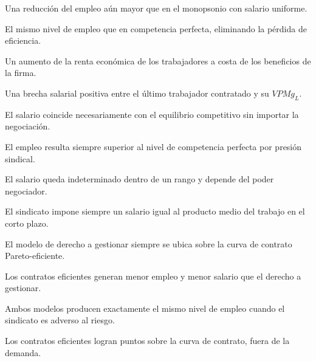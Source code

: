 \begin{opts}
    \item Una reducción del empleo aún mayor que en el monopsonio con salario uniforme.
    \item El mismo nivel de empleo que en competencia perfecta, eliminando la pérdida de eficiencia.
    \item Un aumento de la renta económica de los trabajadores a costa de los beneficios de la firma.
    \item Una brecha salarial positiva entre el último trabajador contratado y su $VPMg_L$.
\end{opts}

\begin{opts}
    \item El salario coincide necesariamente con el equilibrio competitivo sin importar la negociación.
    \item El empleo resulta siempre superior al nivel de competencia perfecta por presión sindical.
    \item El salario queda indeterminado dentro de un rango y depende del poder negociador.
    \item El sindicato impone siempre un salario igual al producto medio del trabajo en el corto plazo.
\end{opts}

\begin{opts}
    \item El modelo de derecho a gestionar siempre se ubica sobre la curva de contrato Pareto-eficiente.
    \item Los contratos eficientes generan menor empleo y menor salario que el derecho a gestionar.
    \item Ambos modelos producen exactamente el mismo nivel de empleo cuando el sindicato es adverso al riesgo.
    \item Los contratos eficientes logran puntos sobre la curva de contrato, fuera de la demanda.
\end{opts}

